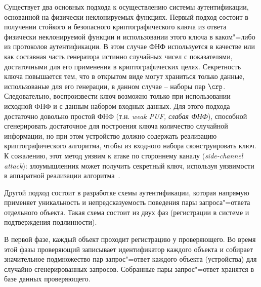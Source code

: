 \begin{enumerate}
Существует два основных подхода к осуществлению системы аутентификации, основанной на физически неклонируемых функциях. Первый подход состоит в получении стойкого и безопасного криптографического ключа из ответа физически неклонируемой функции и использовании этого ключа в каком"=либо из протоколов аутентификации. В этом случае ФНФ используется в качестве или как составная часть генератора истинно случайных чисел с показателями, достаточными для его применения в криптографических целях. Секретность ключа повышается тем, что в открытом виде могут храниться только данные, использованые для его генерации, в данном случае -- наборы пар $\crp$. Следовательно, воспроизвести ключ возможно только при использовании исходной ФНФ и с данным набором входных данных. Для этого подхода достаточно довольно простой ФНФ (т.н. \emph{weak PUF, слабая ФНФ}), способной сгенерировать достаточное для построения ключа количество случайной информации, но при этом устройство должно содержать реализацию криптографического алгоритма, чтобы из входного набора сконструировать ключ. К сожалению, этот метод уязвим к атаке по стороннему каналу (\emph{side-channel attack}): злоумышленник может получить секретный ключ, используя уязвимости в аппаратной реализации алгоритма~\cite{pufbased_auth,puf_cryptography}.

Другой подход состоит в разработке схемы аутентификации, которая напрямую применяет уникальность и непредсказуемость поведения пары запроса"=ответа отдельного объекта. Такая схема состоит из двух фаз (регистрации в системе и подтверждения подлинности).

В первой фазе, каждый объект проходит регистрацию у проверяющего. Во время этой фазы проверяющий записывает идентификатор каждого объекта и собирает значительное подмножество пар запрос"=ответ каждого объекта (устройства) для случайно сгенерированных запросов. Собранные пары запрос"=ответ хранятся в базе данных проверяющего.


\end{enumerate}
